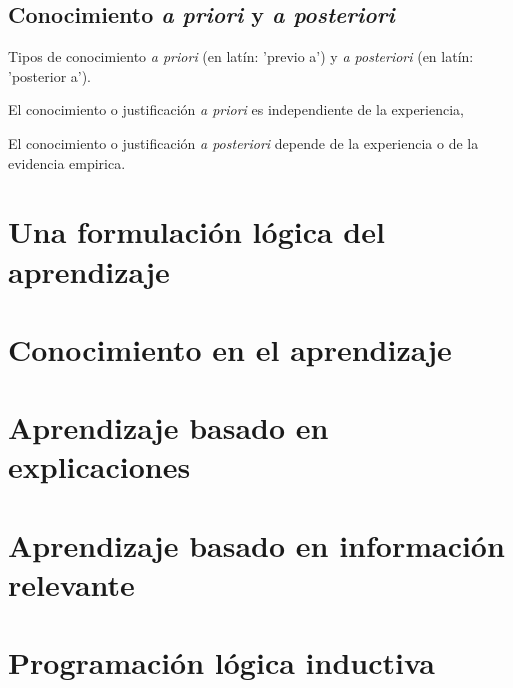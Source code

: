 \documentclass[12 pt, a4paper]{article}
\begin{document}
			
			
		\subsection{Conocimiento \emph{a priori} y \emph{a posteriori}}
			Tipos de conocimiento \emph{a priori} (en latín: 'previo a') y \emph{a posteriori} (en latín: 'posterior a'). 
			
			El conocimiento o justificación \emph{a priori} es independiente de la experiencia, 
			
			El conocimiento o justificación \emph{a posteriori} depende de la experiencia o de la evidencia empirica.
				 
	\section{Una formulación lógica del aprendizaje}
	\section{Conocimiento en el aprendizaje}
	 
	 \section{Aprendizaje basado en explicaciones}
	 
	 \section{Aprendizaje basado en información relevante}
	
	 \section{Programación lógica inductiva}
	 
\end{document}

